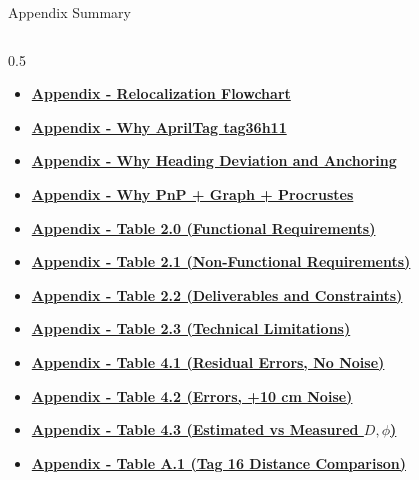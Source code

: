 \documentclass[aspectratio=169, 10pt]{beamer}
\begin{document}
\begin{frame}[noframenumbering]{Appendix Summary}
\begin{outlinecard}
\begin{columns}[T,onlytextwidth]
\begin{column}{0.5\textwidth}
\begin{itemize}
        \item \hyperlink{appendix-flowchart-relocal}{\textbf{Appendix - Relocalization Flowchart}}
        \item \hyperlink{appendix-design-apriltag-family}{\textbf{Appendix - Why AprilTag tag36h11}}
        \item \hyperlink{appendix-design-heading-anchor}{\textbf{Appendix - Why Heading Deviation and Anchoring}}
        \item \hyperlink{appendix-design-estimation-stack}{\textbf{Appendix - Why PnP + Graph + Procrustes}}
        \item \hyperlink{appendix-table-20}{\textbf{Appendix - Table 2.0 (Functional Requirements)}}
        \item \hyperlink{appendix-table-21}{\textbf{Appendix - Table 2.1 (Non-Functional Requirements)}}
        \item \hyperlink{appendix-table-22}{\textbf{Appendix - Table 2.2 (Deliverables and Constraints)}}
        \item \hyperlink{appendix-table-23}{\textbf{Appendix - Table 2.3 (Technical Limitations)}}
        \item \hyperlink{appendix-table-41}{\textbf{Appendix - Table 4.1 (Residual Errors, No Noise)}}
        \item \hyperlink{appendix-table-42}{\textbf{Appendix - Table 4.2 (Errors, +10 cm Noise)}}
        \item \hyperlink{appendix-table-43}{\textbf{Appendix - Table 4.3 (Estimated vs Measured $D,\phi$)}}
        \item \hyperlink{appendix-table-a1}{\textbf{Appendix - Table A.1 (Tag 16 Distance Comparison)}}
      \end{itemize}
    \end{column}
  \end{columns}
\end{outlinecard}
\end{frame}
\end{document}
